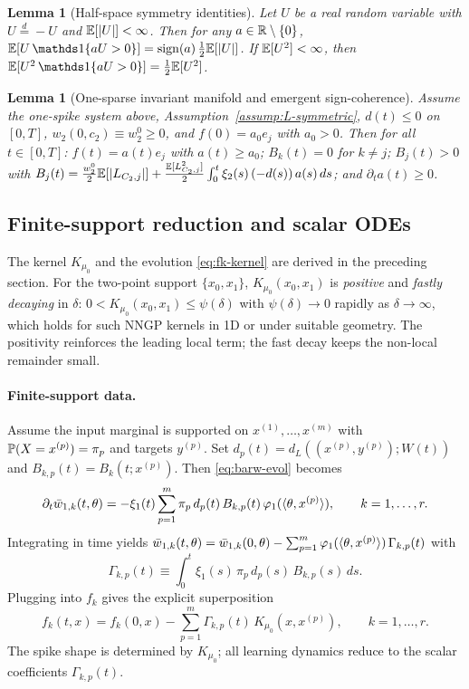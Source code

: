 \documentclass[nohyperref]{article}
\theoremstyle{plain}
\newtheorem{lemma}[theorem]{Lemma}
\theoremstyle{definition}
\theoremstyle{remark}
\begin{document}
\begin{lemma}[Half-space symmetry identities]\label{lem:halfspace-identities}
Let $U$ be a real random variable with $U\overset{d}{=}-U$ and $\mathbb{E}[|U|]<\infty$. Then for any $a\in\R\setminus\{0\}$, $\E[U\,\one \{aU>0\}]=\mathrm{sign}(a)\,\frac{1}{2}\E[|U|]$. If $\mathbb{E}[U^2]<\infty$, then $\E[U^2\,\one \{aU>0\}]=\frac{1}{2}\E[U^2]$.
\end{lemma}

\begin{lemma}[One-sparse invariant manifold and emergent sign-coherence]\label{lem:onesparse-reinforce}
Assume the one-spike system above, Assumption~\ref{assump:L-symmetric}, $d(t)\le 0$ on $[0,T]$, $w_2(0,c_2)\equiv w_2^0\ge 0$, and $f(0)=a_0 e_j$ with $a_0>0$. Then for all $t\in[0,T]$: $f(t)=a(t)e_j$ with $a(t)\ge a_0$; $B_k(t)=0$ for $k\neq j$; $B_j(t)>0$ with $B_j(t)=\frac{w_2^0}{2}\mathbb{E}[|L_{C_2,j}|]+\frac{\mathbb{E}[L_{C_2,j}^2]}{2}\int_0^t \xi_2(s)\,(-d(s))\,a(s)\,ds$; and $\partial_t a(t)\ge 0$.
\end{lemma}

\subsection{Finite-support reduction and scalar ODEs}
\label{app:finite-support-scalar}

The kernel $K_{\mu_0}$ and the evolution \eqref{eq:fk-kernel} are derived in the preceding section. For the two-point support $\{x_0,x_1\}$, $K_{\mu_0}(x_0,x_1)$ is \emph{positive} and \emph{fastly decaying} in $\delta$: $0<K_{\mu_0}(x_0,x_1)\le \psi(\delta)$ with $\psi(\delta)\to 0$ rapidly as $\delta\to\infty$, which holds for such NNGP kernels in 1D or under suitable geometry. The positivity reinforces the leading local term; the fast decay keeps the non-local remainder small.

\paragraph{Finite-support data.}
Assume the input marginal is supported on $x^{(1)},\ldots,x^{(m)}$ with $\mathbb{P}(X=x^{(p)})=\pi_p$ and targets $y^{(p)}$. Set $d_p(t)=d_L((x^{(p)},y^{(p)});W(t))$ and $B_{k,p}(t)=B_k(t;x^{(p)})$. Then \eqref{eq:barw-evol} becomes
\begin{equation}\label{eq:barw-finite-support}
\partial_t \bar w_{1,k}(t,\theta)=-\xi_1(t)\sum_{p=1}^m \pi_p\,d_p(t)\,B_{k,p}(t)\,\varphi_1(\langle \theta, x^{(p)} \rangle),\qquad k=1,\dots,r.
\end{equation}
Integrating in time yields $\bar w_{1,k}(t,\theta)=\bar w_{1,k}(0,\theta)-\sum_{p=1}^m \varphi_1(\langle \theta, x^{(p)} \rangle)\,\Gamma_{k,p}(t)$ with
\begin{equation}\label{eq:Gamma-finite}
\Gamma_{k,p}(t)\equiv \int_0^t \xi_1(s)\,\pi_p\,d_p(s)\,B_{k,p}(s)\,ds.
\end{equation}
Plugging into $f_k$ gives the explicit superposition
\begin{equation}\label{eq:fk-superposition}
f_k(t,x)=f_k(0,x)-\sum_{p=1}^m \Gamma_{k,p}(t)\,K_{\mu_0}(x,x^{(p)}),\qquad k=1,\ldots,r.
\end{equation}
The spike shape is determined by $K_{\mu_0}$; all learning dynamics reduce to the scalar coefficients $\Gamma_{k,p}(t)$.
\end{document}
